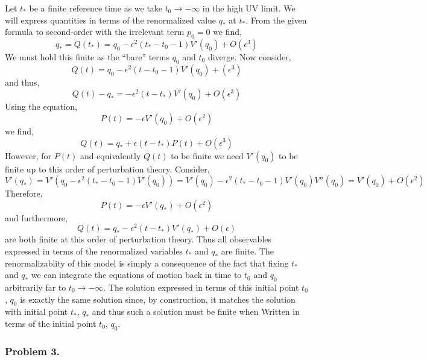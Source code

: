 \documentclass[12pt]{article}
\begin{document}
Let $t_*$ be a finite reference time as we take $t_0 \to - \infty$ in the high UV limit. We will express quantities in terms of the renormalized value $q_*$ at $t_*$. From the given formula to second-order with the irrelevant term $p_0 = 0$ we find, 
\[ q_* = Q(t_*) = q_0 - \epsilon^2(t_* - t_0 - 1)V'(q_0) + O(\epsilon^3) \] 
We must hold this finite as the ``bare'' terms $q_0$ and $t_0$ diverge. Now consider,
\[ Q(t) = q_0 - \epsilon^2 (t - t_0 - 1) V'(q_0) + (\epsilon^3) \]
and thus,
\[ Q(t) - q_* = -\epsilon^2(t - t_*) V'(q_0) + O(\epsilon^3) \]
Using the equation,
\[ P(t) = - \epsilon V'(q_0) + O(\epsilon^2) \]
we find,
\[ Q(t) = q_* + \epsilon (t - t_*) P(t) + O(\epsilon^3) \]
However, for $P(t)$ and equivalently $Q(t)$ to be finite we need $V'(q_0)$ to be finite up to this order of perturbation theory. Consider,
\[ V'(q_*) = V'(q_0 - \epsilon^2(t_* - t_0 - 1) V'(q_0)) = V'(q_0) - \epsilon^2(t_* - t_0 - 1) V'(q_0) V''(q_0)  = V'(q_0) + O(\epsilon^2) \]
Therefore,
\[ P(t) = - \epsilon V'(q_*) + O(\epsilon^2) \]
and furthermore, 
\[ Q(t) = q_* - \epsilon^2 (t - t_*) V'(q_*) + O(\epsilon) \] 
are both finite at this order of perturbation theory. Thus all observables expressed in terms of the renormalized variables $t_*$ and $q_*$ are finite. The renormalizablity of this model is simply a consequence of the fact that fixing $t_*$ and $q_*$ we can integrate the equations of motion back in time to $t_0$ and $q_0$ arbitrarily far to $t_0 \to - \infty$. The solution expressed in terms of this initial point $t_0$, $q_0$ is exactly the same solution since, by construction, it matches the solution with initial point $t_*$, $q_*$ and thus such a solution must be finite when Written in terms of the initial point $t_0$, $q_0$.  


\subsubsection{Problem 3.}
\end{document}
